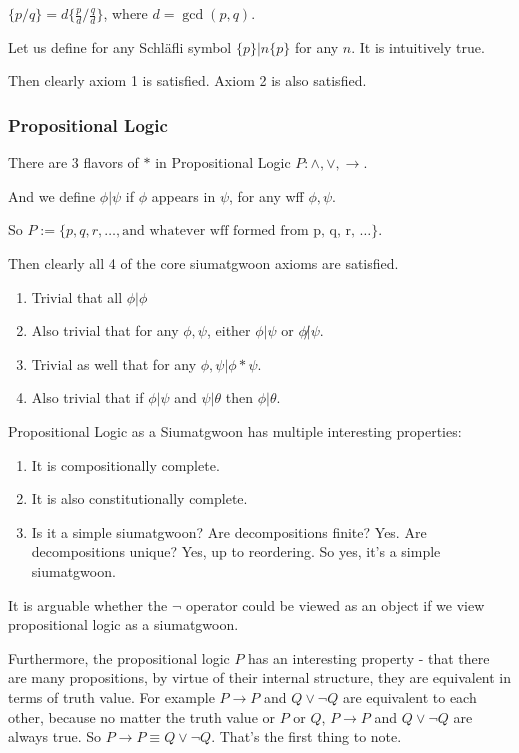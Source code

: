 $\{p/q\}=d\{ \frac{p}{d} / \frac{q}{d} \}$, where $d=\gcd(p,q)$.

Let us define for any Schläfli symbol $\{p\} | n\{p\}$ for any $n$. It is intuitively true.

Then clearly axiom 1 is satisfied. Axiom 2 is also satisfied.

\subsubsection{Propositional Logic}

There are 3 flavors of $*$ in Propositional Logic $P: \wedge, \vee, \rightarrow$. 

And we define $\phi | \psi$ if $\phi$ appears in $\psi$, for any wff $\phi, \psi$.

So $P := \{ p, q, r, \ldots, \text{and whatever wff formed from p, q, r, \ldots} \}$.

Then clearly all 4 of the core siumatgwoon axioms are satisfied. 

\begin{enumerate}
\item Trivial that all $\phi | \phi$
\item Also trivial that for any $\phi, \psi$, either $\phi|\psi$ or $\phi\not|\psi$.
\item Trivial as well that for any $\phi,\psi | \phi * \psi$.
\item Also trivial that if $\phi | \psi$ and $\psi | \theta$ then $\phi | \theta$.
\end{enumerate}

Propositional Logic as a Siumatgwoon has multiple interesting properties: 

\begin{enumerate}
\item It is compositionally complete. 
\item It is also constitutionally complete. 
\item Is it a simple siumatgwoon? Are decompositions finite? Yes. Are decompositions unique? Yes, up to reordering. So yes, it's a simple siumatgwoon.
\end{enumerate}

It is arguable whether the $\neg$ operator could be viewed as an object if we view propositional logic as a siumatgwoon. 


Furthermore, the propositional logic $P$ has an interesting property - that there are many propositions, by virtue of their internal structure, they are equivalent in terms of truth value. For example $P \rightarrow P$ and $Q \vee \neg Q$ are equivalent to each other, because no matter the truth value or $P$ or $Q$, $P \rightarrow P$ and $Q \vee \neg Q$ are always true. So $P \rightarrow P \equiv Q \vee \neg Q$. That's the first thing to note.

